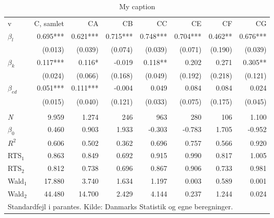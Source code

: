 \begin{table}[tb]
\centering
\caption{My caption}
\label{my-label}
\begin{tabular}{@{}lrrrrrrr@{}}\toprule
v             & C, samlet & CA       & CB       & CC       & CE       & CF      & CG       \\ \arrayrulecolor{MidnightBlue}\midrule
$\beta_l$      & 0.695***  & 0.621*** & 0.715*** & 0.748*** & 0.704*** & 0.462** & 0.676*** \\
              & (0.013)   & (0.039)  & (0.074)  & (0.039)  & (0.071)  & (0.190) & (0.039)  \\
$\beta_k$      & 0.117***  & 0.116*   & -0.019   & 0.118**  & 0.202    & 0.271   & 0.305**  \\
              & (0.024)   & (0.066)  & (0.168)  & (0.049)  & (0.192)  & (0.218) & (0.121)  \\
$\beta_{ed}$ & 0.051***  & 0.111*** & -0.004   & 0.049    & 0.084    & 0.084   & 0.024    \\
              & (0.015)   & (0.040)  & (0.121)  & (0.033)  & (0.075)  & (0.175) & (0.045)  \\
              &           &          &          &          &          &         &          \\
\emph{N}  & 9.959     & 1.274    & 246      & 963      & 280      & 106     & 1.100    \\
$\beta_0$         & 0.460     & 0.903    & 1.933    & -0.303   & -0.783   & 1.705   & -0.952   \\
$R^2$            & 0.606     & 0.502    & 0.362    & 0.696    & 0.757    & 0.566   & 0.920    \\
RTS$_1$          & 0.863     & 0.849    & 0.692    & 0.915    & 0.990    & 0.817   & 1.005    \\
RTS$_2$           & 0.812     & 0.738    & 0.696    & 0.867    & 0.906    & 0.733   & 0.981    \\
Wald$_1$         & 17.880    & 3.740    & 1.634    & 1.197    & 0.003    & 0.589   & 0.001    \\
Wald$_2$         & 44.480    & 14.700   & 2.429    & 4.144    & 0.237    & 1.244   & 0.024   \\ \midrule
\multicolumn{8}{l}{Standardfejl i parantes. Kilde: Danmarks Statistik og egne beregninger.} \\
\bottomrule
\end{tabular}
\end{table}